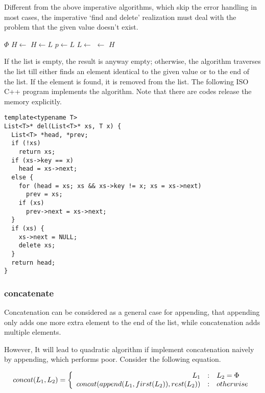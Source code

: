\documentclass{article}
\begin{document}
Different from the above imperative algorithms, which skip the error handling in most cases, the imperative `find and delete' realization must deal with the
problem that the given value doesn't exist.

\begin{algorithmic}
   
    \State \Return $\Phi$
  \EndIf
    \State $H \gets$ 
  \Else
    \State $H \gets L$
     
      \State $p \gets L$
      \State $L \gets$ 
    \EndWhile
     
      \State {} $\gets$ 
    \EndIf
  \EndIf
  \State \Return $H$
\EndFunction
\end{algorithmic}

If the list is empty, the result is anyway empty; otherwise, the algorithm traverses the list till either finds an element identical to the given value or to the
end of the list. If the element is found, it is removed from the list. The following ISO C++ program implements the algorithm. Note that there are codes release the memory explicitly.

\lstset{language=C++}
\begin{lstlisting}
template<typename T>
List<T>* del(List<T>* xs, T x) {
  List<T> *head, *prev;
  if (!xs)
    return xs;
  if (xs->key == x)
    head = xs->next;
  else {
    for (head = xs; xs && xs->key != x; xs = xs->next)
      prev = xs;
    if (xs)
      prev->next = xs->next;
  }
  if (xs) {
    xs->next = NULL;
    delete xs;
  }
  return head;
}
\end{lstlisting}

\subsubsection{concatenate}
\label{concat}
Concatenation can be considered as a general case for appending, that appending only adds one more extra element to the end of the list, while concatenation adds multiple elements.

However, It will lead to quadratic algorithm if implement concatenation naively by appending, which performs poor. Consider the
following equation.

\[
concat(L_1, L_2) = \left \{
  \begin{array}
  {r@{\quad:\quad}l}
  L_1 & L_2 = \Phi \\
  concat(append(L_1, first(L_2)), rest(L_2)) & otherwise
  \end{array}
\right.
\]
\end{document}
